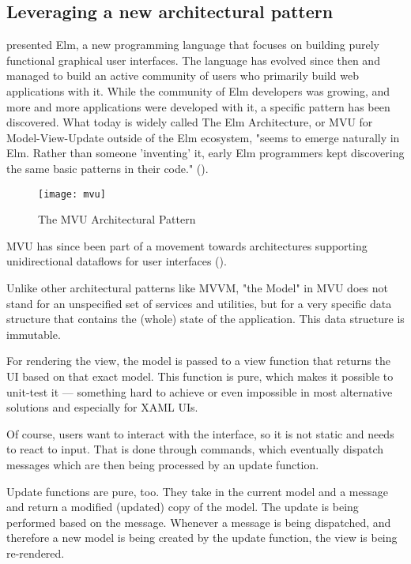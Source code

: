 \subsection{Leveraging a new architectural pattern}

\cite{czaplicki_elm:_2012} presented Elm, a new programming language that focuses on building purely functional graphical user interfaces. The language has evolved since then and managed to build an active community of users who primarily build web applications with it. While the community of Elm developers was growing, and more and more applications were developed with it, a specific pattern has been discovered. What today is widely called The Elm Architecture, or MVU for Model-View-Update outside of the Elm ecosystem, "seems to emerge naturally in Elm. Rather than someone 'inventing' it, early Elm programmers kept discovering the same basic patterns in their code." (\cite{czaplicki_elm_2018}).

\begin{figure}[H]
\centering
\caption{The MVU Architectural Pattern}
\label{fig:chasm}
\texttt{[image: mvu]}
\end{figure}

MVU has since been part of a movement towards architectures supporting unidirectional dataflows for user interfaces (\cite{staltz_unidirectional_2015}).

Unlike other architectural patterns like MVVM, "the Model" in MVU does not stand for an unspecified set of services and utilities, but for a very specific data structure that contains the (whole) state of the application. This data structure is immutable.

For rendering the view, the model is passed to a view function that returns the UI based on that exact model. This function is pure, which makes it possible to unit-test it — something hard to achieve or even impossible in most alternative solutions and especially for XAML UIs.

Of course, users want to interact with the interface, so it is not static and needs to react to input. That is done through commands, which eventually dispatch messages which are then being processed by an update function.

Update functions are pure, too. They take in the current model and a message and return a modified (updated) copy of the model. The update is being performed based on the message. Whenever a message is being dispatched, and therefore a new model is being created by the update function, the view is being re-rendered.

